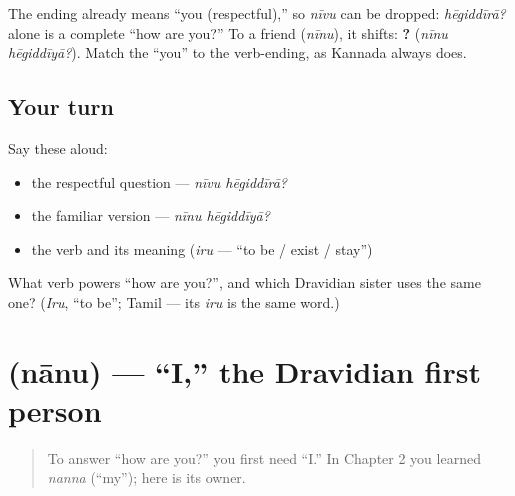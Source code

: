 \begin{grammarlens}[title={Grammar Lens: the verb carries \textquotedblleft{}you\textquotedblright{}}]
The ending already means \textquotedblleft{}you (respectful),\textquotedblright{} so \emph{nīvu} can be dropped: \emph{hēgiddīrā?} alone is a complete \textquotedblleft{}how are you?\textquotedblright{} To a friend (\emph{nīnu}), it shifts: \textbf{ ?} (\emph{nīnu hēgiddīyā?}). Match the \textquotedblleft{}you\textquotedblright{} to the verb-ending, as Kannada always does.
\end{grammarlens}

\subsection*{Your turn}
Say these aloud:

\begin{itemize}
\raggedright
  \item the respectful question — \emph{nīvu hēgiddīrā?}
  \item the familiar version — \emph{nīnu hēgiddīyā?}
  \item the verb and its meaning (\emph{iru} — \textquotedblleft{}to be / exist / stay\textquotedblright{})
\end{itemize}

\begin{tcolorbox}[breakable,colback=teal!4,colframe=teal!35!black,title={Before you move on}]
What verb powers \textquotedblleft{}how are you?\textquotedblright{}, and which Dravidian sister uses the same one? (\emph{Iru}, \textquotedblleft{}to be\textquotedblright{}; Tamil — its \emph{iru} is the same word.)
\end{tcolorbox}
\section[\texorpdfstring{\kn{ನಾನು} (nānu)}{ನಾನು (nānu)}]{ (nānu) — \textquotedblleft{}I,\textquotedblright{} the Dravidian first person}

\label{lesson:KA-C03-naanu}



\begin{quote}
To answer \textquotedblleft{}how are you?\textquotedblright{} you first need \textquotedblleft{}I.\textquotedblright{} In Chapter 2 you learned \emph{nanna} (\textquotedblleft{}my\textquotedblright{}); here is its owner.
\end{quote}

